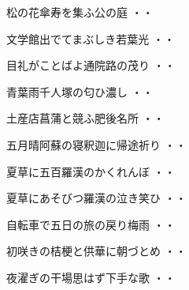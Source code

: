 \vspace{0.6cm}
\begin{shiika}松の花傘寿を集ふ公の庭
\hfill{・・}\end{shiika}
\vspace{0.6cm}
\begin{shiika}文学館出でてまぶしき若葉光
\hfill{・・}\end{shiika}
\vspace{0.6cm}
\begin{shiika}目礼がことばよ通院路の茂り
\hfill{・・}\end{shiika}
\vspace{0.6cm}
\begin{shiika}青葉雨千人塚の匂ひ濃し
\hfill{・・}\end{shiika}
\vspace{0.6cm}
\begin{shiika}土産店菖蒲と競ふ肥後名所
\hfill{・・}\end{shiika}
\vspace{0.6cm}
\begin{shiika}五月晴阿蘇の寝釈迦に帰途祈り
\hfill{・・}\end{shiika}
\vspace{0.6cm}
\begin{shiika}夏草に五百羅漢のかくれんぼ
\hfill{・・}\end{shiika}
\vspace{0.6cm}
\begin{shiika}夏草にあそびつ羅漢の泣き笑ひ
\hfill{・・}\end{shiika}
\vspace{0.6cm}
\begin{shiika}自転車で五日の旅の戻り梅雨
\hfill{・・}\end{shiika}
\vspace{0.6cm}
\begin{shiika}初咲きの桔梗と供華に朝づとめ
\hfill{・・}\end{shiika}
\vspace{0.6cm}
\begin{shiika}夜濯ぎの干場思はず下手な歌
\hfill{・・}\end{shiika}
